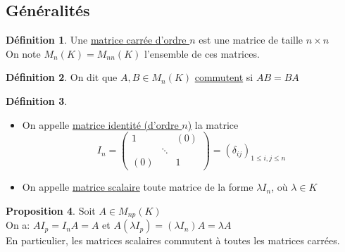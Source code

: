 \documentclass[10pt,a4paper]{article}
\theoremstyle{definition}
\newtheorem{proposition}{Proposition}[section]
\newtheorem{definition}[proposition]{Définition}
\begin{document}
\subsection{Généralités}
\begin{definition}
Une \uline{matrice carrée d'ordre $n$} est une matrice de taille $n \times n$ \\
On note $M_n(K) = M_{nn}(K)$ l'ensemble de ces matrices.
\end{definition}
\begin{definition}
On dit que $A, B \in M_n(K)$ \uline{commutent} si $AB = BA$
\end{definition}
\begin{definition}
\hfill
\begin{itemize}
\item On appelle \uline{matrice identité (d'ordre $n$)} la matrice
\[ I_n = \begin{pmatrix}
1 & & (0) \\
 & \ddots & \\
(0) & & 1
\end{pmatrix} = \left(\delta_{ij}\right)_{1 \leq i, j \leq n} \]
\item On appelle \uline{matrice scalaire} toute matrice de la forme $\lambda I_n$, où $\lambda \in K$
\end{itemize}
\end{definition}
\begin{proposition}
Soit $A \in M_{np}(K)$ \\
On a: $A I_p = I_n A = A$ et $A (\lambda I_p) = (\lambda I_n) A = \lambda A$ \\
En particulier, les matrices scalaires commutent à toutes les matrices carrées.
\end{proposition}
\end{document}
